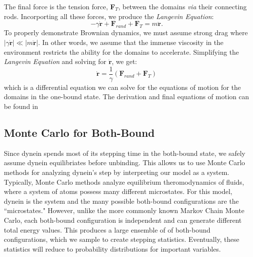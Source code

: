 The final force is the tension force, \textbf{F}$_T$, between the domains \textit{via} their connecting rods. Incorporting all these forces, we produce the \textit{Langevin Equation}:
\begin{equation}
	-\gamma \dot{\textbf{r}} + \textbf{F}_{rand} + \textbf{F}_T = m\ddot{\textbf{r}}.
\end{equation}
To properly demonstrate Brownian dynamics, we must assume strong drag where $|\gamma \dot{\textbf{r}}|\ll |m\ddot{\textbf{r}}|$. In other words, we assume that the immense viscosity in the environment restricts the ability for the domains to accelerate. Simplifying the \textit{Langevin Equation} and solving for $\dot{\textbf{r}}$, we get:
\begin{equation}
	\dot{\textbf{r}}=\frac{1}{\gamma}(\textbf{F}_{rand} + \textbf{F}_T)
\end{equation}
which is a differential equation we can solve for the equations of motion for the domains in the one-bound state. The derivation and final equations of motion can be found in \cite{Capek2017, W}


\subsection{Monte Carlo for Both-Bound}
Since dynein spends most of its stepping time in the both-bound state, we safely assume dynein equilibriates before unbinding. This allows us to use Monte Carlo methods for analyzing dynein's step by interpreting our model as a system. Typically, Monte Carlo methods analyze equilibrium theromodynamics of fluids, where a system of atoms possess many different microstates. For this model, dynein is the system and the many possible both-bound configurations are the ``microstates." However, unlike the more commonly known Markov Chain Monte Carlo, each both-bound configuration is independent and can generate different total energy values. This produces a large ensemble of of both-bound configurations, which we sample to create stepping statistics. Eventually, these statistics will reduce to probability distributions for important variables.

